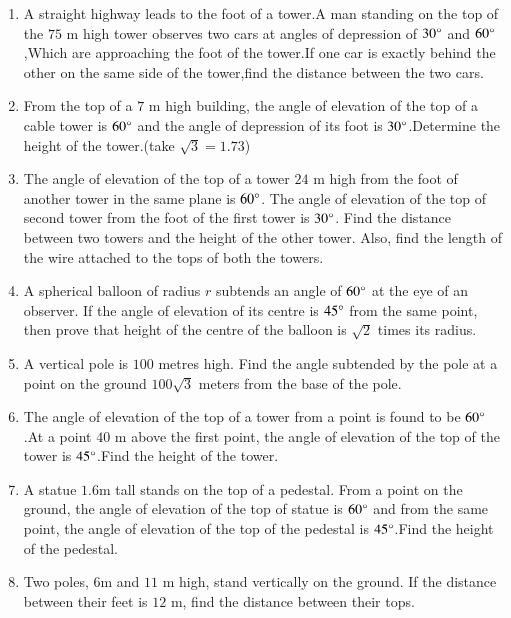 \begin{enumerate}[label=\thesubsection.\arabic*.,ref=\thesubsection.\theenumi]
\item A straight highway leads to the foot of a tower.A man standing on the top of the $75$ m high tower observes two cars at angles of depression of $30\degree$ and $60\degree$,Which are approaching the foot of the tower.If one car is exactly behind the other on the same side of the tower,find the distance between the two cars.
    \hfill{}\item From the top of a $7$ m high building, the angle of elevation of the top of a cable tower is $60\degree$ and the angle of depression of its foot is $30\degree$.Determine the height of the tower.(take $\sqrt{3}=1.73$)
\hfill{}\item The angle of elevation of the top of a tower $24$ m high from the foot of another tower in the same plane is ${60}{\degree}$. The angle of elevation of the top of second tower from the foot of the first tower is ${30}{\degree}$. Find the distance between two towers and the height of the other tower. Also, find the length of the wire attached to the tops of both the towers.
\hfill{}\item A spherical balloon of radius $r$ subtends an angle of ${60}{\degree}$ at the eye of an observer. If the angle of elevation of its centre is ${45}{\degree}$ from the same point, then prove that height of the centre of the balloon is $\sqrt{2}$ times its radius.
    \hfill{}

\item A vertical pole is $100$ metres high. Find the angle subtended by the pole at a point on
the ground $100 \sqrt{3}$ meters from the base of the pole.

    \hfill{}\item The angle of elevation of the top of a tower from a point is found to be $60\degree$.At a point $40$ m above the first point, the angle of elevation of the top of the tower is $45\degree$.Find the height of the tower.
    \hfill{}\item A statue $1.6$m tall stands on the top of a pedestal. From a point on the ground, the angle of elevation of the top of statue is $60\degree$ and from the same point, the angle of elevation of the top of the pedestal is $45\degree$.Find the height of the pedestal.
    \hfill{}\item Two poles, $6$m and $11$ m high, stand vertically on the ground. If the distance between their feet is $12$ m, find the distance between their tops.


\end{enumerate}
